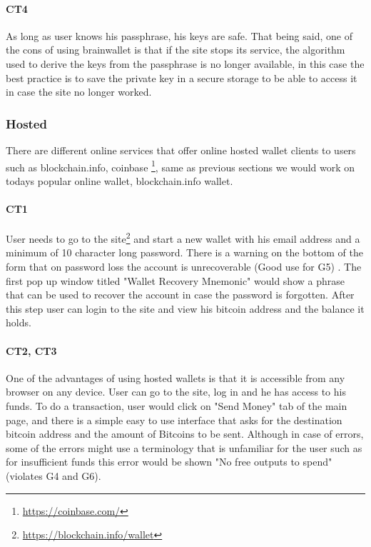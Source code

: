 \paragraph{CT4} As long as user knows his passphrase, his keys are safe. That being said, one of the cons of using brainwallet is that if the site stops its service, the algorithm used to derive the keys from the passphrase is no longer available, in this case the best practice is to save the private key in a secure storage to be able to access it in case the site no longer worked.


\subsubsection{Hosted}
\label{hosted}
There are different online services that offer online hosted wallet clients to users such as blockchain.info, coinbase \footnote{\url{https://coinbase.com/}}, same as previous sections we would work on todays popular online wallet, blockchain.info wallet.

\paragraph{CT1} User needs to go to the site\footnote{\url{https://blockchain.info/wallet}} and start a new wallet with his email address and a minimum of 10 character long password. There is a warning on the bottom of the form that on password loss the account is unrecoverable (Good use for G5) . The first pop up window titled "Wallet Recovery Mnemonic" would show a phrase that can be used to recover the account in case the password is forgotten. After this step user can login to the site and view his bitcoin address and the balance it holds.

\paragraph{CT2, CT3}
\label{hosted transaction}
One of the advantages of using hosted wallets is that it is accessible from any browser on any device. User can go to the site, log in and he has access to his funds. To do a transaction, user would click on "Send Money" tab of the main page, and there is a simple easy to use interface that asks for the destination bitcoin address and the amount of Bitcoins to be sent. Although in case of errors, some of the errors might use a terminology that is unfamiliar for the user such as for insufficient funds this error would be shown "No free outputs to spend" (violates G4 and G6).

